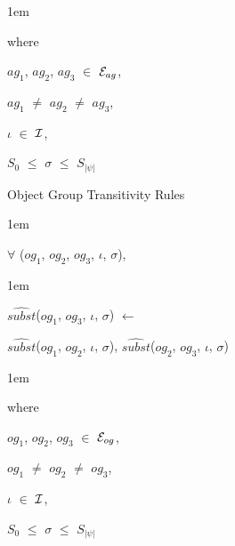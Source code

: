 \documentclass[11pt]{report}
\newenvironment{vquote}
{
  \begin{list}{}{\leftmargin 1em}\item[]
}
{
  \end{list}
}
\begin{document}
\begin{enumerate}
                \begin{vquote}
                  where

                  \hspace{1em}
                  $ag_{1}$, $ag_{2}$, $ag_{3}$ $\in$ ${\cal E}_{ag}$,

                  \hspace{1em}
                  $ag_{1}$ $\neq$ $ag_{2}$ $\neq$ $ag_{3}$,

                  \hspace{1em}
                  $\iota$ $\in$ ${\cal I}$,

                  \hspace{1em}
                  $S_{0}$ $\leq$ $\sigma$ $\leq$ $S_{|\psi|}$
                \end{vquote}
              \item
                Object Group Transitivity Rules

                \begin{vquote}
                  $\forall$ ($og_{1}$, $og_{2}$, $og_{3}$, $\iota$, $\sigma$),
                \end{vquote}

                \begin{vquote}
                  $\hat{subst}$($og_{1}$, $og_{3}$, $\iota$, $\sigma$)
                  $\leftarrow$

                  \hspace{1em}
                  $\hat{subst}$($og_{1}$, $og_{2}$, $\iota$, $\sigma$),
                  $\hat{subst}$($og_{2}$, $og_{3}$, $\iota$, $\sigma$)
                \end{vquote}

                \begin{vquote}
                  where

                  \hspace{1em}
                  $og_{1}$, $og_{2}$, $og_{3}$ $\in$ ${\cal E}_{og}$,

                  \hspace{1em}
                  $og_{1}$ $\neq$ $og_{2}$ $\neq$ $og_{3}$,

                  \hspace{1em}
                  $\iota$ $\in$ ${\cal I}$,

                  \hspace{1em}
                  $S_{0}$ $\leq$ $\sigma$ $\leq$ $S_{|\psi|}$
                \end{vquote}
            \end{enumerate}
\end{document}
